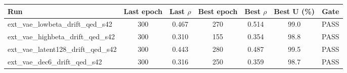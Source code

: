 \begin{tabular}{l c c c c c c}
\toprule
Run & Last epoch & Last $\rho$ & Best epoch & Best $\rho$ & Best U (\%) & Gate \\
\midrule
ext\_vae\_lowbeta\_drift\_qed\_s42 & 300 & 0.467 & 270 & 0.514 & 99.0 & PASS \\
ext\_vae\_highbeta\_drift\_qed\_s42 & 300 & 0.310 & 155 & 0.354 & 98.8 & PASS \\
ext\_vae\_latent128\_drift\_qed\_s42 & 300 & 0.443 & 280 & 0.487 & 99.5 & PASS \\
ext\_vae\_dec6\_drift\_qed\_s42 & 300 & 0.316 & 250 & 0.359 & 98.7 & PASS \\
\bottomrule
\end{tabular}
